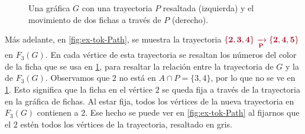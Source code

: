 \begin{figure}[ht!]
    \caption{Una gr\'afica $G$ con una trayectoria $P$ resaltada (izquierda) y
     el movimiento de dos fichas a trav\'es de $P$ (derecho).}
    \label{fig:ex-tok-aux}
\end{figure}
    
M\'as adelante, en \cref{fig:ex-tok-Path}, se muestra la trayectoria
${\color{vino}\bf \{2,3,4\}\xrightarrow[P]{}\{2,4,5\}}$ en $F_3(G)$. En cada
v\'ertice de esta trayectoria se resaltan los n\'umeros del color de la ficha
que se usa en \cref{fig:ex-tok-aux}, para resaltar la relaci\'on entre la
trayectoria de $G$ y la de $F_3(G)$. Observamos que $2$ no est\'a en $A \cap P
=\{3,4\}$, por lo que no se ve en \cref{fig:ex-tok-aux}. Esto significa que la
ficha en el v\'ertice $2$ se queda fija a trav\'es de la trayectoria en la
gr\'afica de fichas. Al estar fija, todos los v\'ertices de la nueva trayectoria
en $F_3(G)$ contienen a $2$. Ese hecho se puede ver en \cref{fig:ex-tok-Path} al
fijarnos que el $2$ est\' en todos los v\'ertices de la trayectoria, resaltado
en gris.


